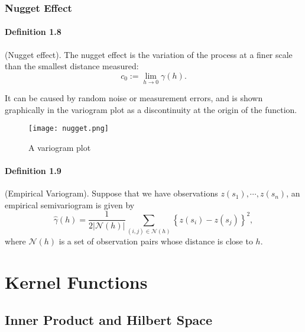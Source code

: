 \documentclass{article}
\begin{document}
\subsubsection{Nugget Effect}
\paragraph{Definition 1.8} (Nugget effect). The nugget effect is the variation of the process at a finer scale than the smallest distance measured:
\begin{equation*}
	c_0 := \lim_{h\to 0}\gamma(h).\tag{1.17}
\end{equation*}

It can be caused by random noise or measurement errors, and is shown graphically in the variogram plot as a discontinuity at the origin of the function.

\begin{figure}[H]
	\centering
	\texttt{[image: nugget.png]}
	\caption{A variogram plot}
\end{figure}

\paragraph{Definition 1.9} (Empirical Variogram). Suppose that we have observations $z(s_1),\cdots,z(s_n)$, an empirical semivariogram is given by
\begin{equation*}
	\hat{\gamma}(h) = \frac{1}{2\vert\mathcal{N}(h)\vert}\sum_{(i,j)\in\mathcal{N}(h)}\left\lbrace z(s_i) - z(s_j)\right\rbrace^2,\tag{1.18}
\end{equation*}
where $\mathcal{N}(h)$ is a set of observation pairs whose distance is close to $h$.

\newpage

\section{Kernel Functions}
\subsection{Inner Product and Hilbert Space}
\end{document}
